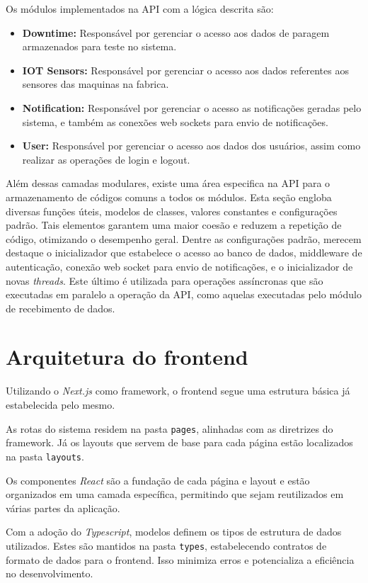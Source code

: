 Os módulos implementados na API com a lógica descrita são:
\begin{itemize}
	\item \textbf{Downtime:} Responsável por gerenciar o acesso aos dados de paragem armazenados para teste no sistema.
	\item \textbf{IOT Sensors:} Responsável por gerenciar o acesso aos dados referentes aos sensores das maquinas na fabrica.
	\item \textbf{Notification:} Responsável por gerenciar o acesso as notificações geradas pelo sistema, e também as conexões web sockets para envio de notificações.
	\item \textbf{User:} Responsável por gerenciar o acesso aos dados dos usuários, assim como realizar as operações de login e logout. 
\end{itemize}

Além dessas camadas modulares, existe uma área especifica na API para o armazenamento de códigos comuns a todos os módulos. Esta seção engloba diversas funções úteis, modelos de classes, valores constantes e configurações padrão. Tais elementos garantem uma maior coesão e reduzem a repetição de código, otimizando o desempenho geral. Dentre as configurações padrão, merecem destaque o inicializador que estabelece o acesso ao banco de dados, middleware de autenticação, conexão web socket para envio de notificações, e o inicializador de novas \textit{threads}. Este último é utilizada para operações assíncronas que são executadas em paralelo a operação da API, como aquelas executadas pelo módulo de recebimento de dados.

\section[Arquitetura do frontend]{Arquitetura do frontend}
Utilizando o \textit{Next.js} como framework, o frontend segue uma estrutura básica já estabelecida pelo mesmo.

As rotas do sistema residem na pasta \texttt{pages}, alinhadas com as diretrizes do framework. Já os layouts que servem de base para cada página estão localizados na pasta \texttt{layouts}.

Os componentes \textit{React} são a fundação de cada página e layout e estão organizados em uma camada específica, permitindo que sejam reutilizados em várias partes da aplicação.

Com a adoção do \textit{Typescript}, modelos definem os tipos de estrutura de dados utilizados. Estes são mantidos na pasta \texttt{types}, estabelecendo contratos de formato de dados para o frontend. Isso minimiza erros e potencializa a eficiência no desenvolvimento.

